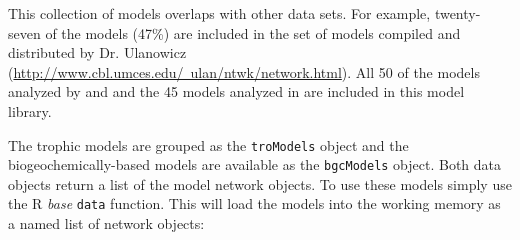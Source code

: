 \documentclass[11pt]{article}
\begin{document}
This collection of models overlaps with other data sets.  For example,
twenty-seven of the models (47\%) are included in the set of models
compiled and distributed by Dr. Ulanowicz
(\href{http://www.cbl.umces.edu/~ulan/ntwk/network.html}{http://www.cbl.umces.edu/~ulan/ntwk/network.html}).
All 50 of the models analyzed by \citet{borrett10_hmg} and
\citet{salas11_did} and the 45 models analyzed in \citet{borrett13}
are included in this model library.

The trophic models are grouped as the \texttt{troModels} object and
the biogeochemically-based models are available as the
\texttt{bgcModels} object.  Both data objects return a list of the
model network objects.  To use these models simply use the R
\textit{base} \texttt{data} function. This will load the models into
the working memory as a named list of network objects:
\end{document}
